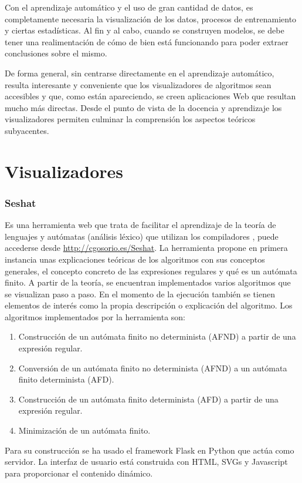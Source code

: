 
Con el aprendizaje automático y el uso de gran cantidad de datos, es
completamente necesaria la visualización de los datos, procesos de entrenamiento
y ciertas estadísticas. Al fin y al cabo, cuando se construyen modelos, se debe
tener una realimentación de cómo de bien está funcionando para poder extraer
conclusiones sobre el mismo.

De forma general, sin centrarse directamente en el aprendizaje automático,
resulta interesante y conveniente que los visualizadores de algoritmos sean
accesibles y que, como están apareciendo, se creen aplicaciones Web que resultan
mucho más directas. Desde el punto de vista de la docencia y aprendizaje los
visualizadores permiten culminar la comprensión los aspectos teóricos
subyacentes.

\section{Visualizadores}

\subsubsection{Seshat} 
Es una herramienta web que trata de facilitar el aprendizaje de
la teoría de lenguajes y autómatas (análisis léxico) que utilizan los
compiladores \cite{arnaiz2018seshat} , puede accederse desde
\url{http://cgosorio.es/Seshat}. La herramienta propone en primera instancia
unas explicaciones teóricas de los algoritmos con sus conceptos generales, el
concepto concreto de las expresiones regulares y qué es un autómata finito. A
partir de la teoría, se encuentran implementados varios algoritmos que se
visualizan paso a paso. En el momento de la ejecución también se tienen
elementos de interés como la propia descripción o explicación del algoritmo. Los
algoritmos implementados por la herramienta son:
\begin{enumerate}
    \item Construcción de un autómata finito no determinista (AFND) a partir de una expresión regular.
    \item Conversión de un autómata finito no determinista (AFND) a un autómata finito determinista (AFD).
    \item Construcción de un autómata finito determinista (AFD) a partir de una expresión regular.
    \item Minimización de un autómata finito.
\end{enumerate}
Para su construcción se ha usado el framework Flask en Python que actúa como
servidor. La interfaz de usuario está construida con HTML, SVGs y Javascript
para proporcionar el contenido dinámico.

